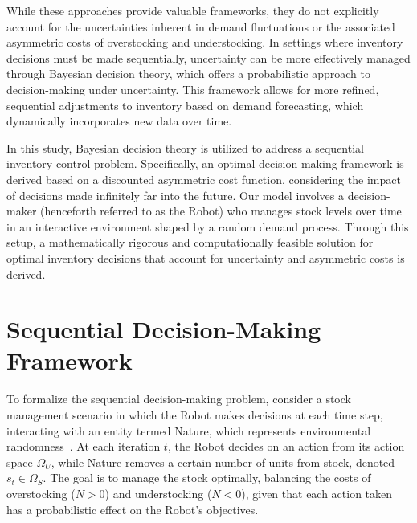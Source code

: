 \documentclass[a4paper,12pt]{article}
\theoremstyle{definition}
\begin{document}
	While these approaches provide valuable frameworks, they do not explicitly account for the uncertainties inherent in demand fluctuations or the associated asymmetric costs of overstocking and understocking. In settings where inventory decisions must be made sequentially, uncertainty can be more effectively managed through Bayesian decision theory, which offers a probabilistic approach to decision-making under uncertainty. This framework allows for more refined, sequential adjustments to inventory based on demand forecasting, which dynamically incorporates new data over time.
	
	In this study, Bayesian decision theory is utilized to address a sequential inventory control problem. Specifically, an optimal decision-making framework is derived based on a discounted asymmetric cost function, considering the impact of decisions made infinitely far into the future. Our model involves a decision-maker (henceforth referred to as the Robot) who manages stock levels over time in an interactive environment shaped by a random demand process. Through this setup, a mathematically rigorous and computationally feasible solution for optimal inventory decisions that account for uncertainty and asymmetric costs is derived.
	
	\section{Sequential Decision-Making Framework}
	To formalize the sequential decision-making problem, consider a stock management scenario in which the Robot makes decisions at each time step, interacting with an entity termed Nature, which represents environmental randomness~\citep{lavalle2006}. At each iteration $t$, the Robot decides on an action from its action space $\Omega_U$, while Nature removes a certain number of units from stock, denoted $s_t \in \Omega_S$. The goal is to manage the stock optimally, balancing the costs of overstocking ($N > 0$) and understocking ($N < 0$), given that each action taken has a probabilistic effect on the Robot’s objectives.
	
\end{document}
